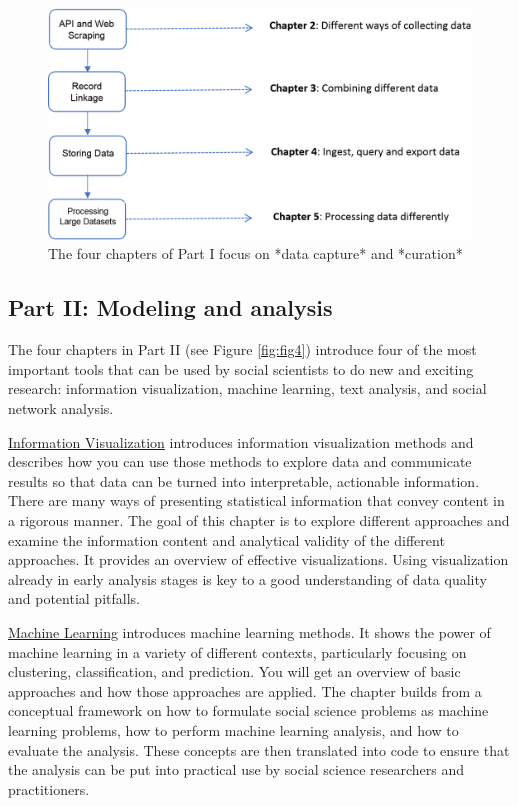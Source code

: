 \documentclass[]{krantz}
\begin{document}
\begin{figure}

{\centering \includegraphics[width=0.9\linewidth]{ChapterIntro/figures/Figure2_new} 

}

\caption{The four chapters of Part I focus on *data capture* and *curation*}\label{fig:fig3}
\end{figure}

\subsection{Part II: Modeling and
analysis}\label{part-ii-modeling-and-analysis}

The four chapters in Part II (see Figure \ref{fig:fig4}) introduce four
of the most important tools that can be used by social scientists to do
new and exciting research: information visualization, machine learning,
text analysis, and social network analysis.

\protect\hyperlink{chap:viz}{Information Visualization} introduces
information visualization methods and describes how you can use those
methods to explore data and communicate results so that data can be
turned into interpretable, actionable information. There are many ways
of presenting statistical information that convey content in a rigorous
manner. The goal of this chapter is to explore different approaches and
examine the information content and analytical validity of the different
approaches. It provides an overview of effective visualizations. Using
visualization already in early analysis stages is key to a good
understanding of data quality and potential pitfalls.

\protect\hyperlink{chap:ml}{Machine Learning} introduces machine
learning methods. It shows the power of machine learning in a variety of
different contexts, particularly focusing on clustering, classification,
and prediction. You will get an overview of basic approaches and how
those approaches are applied. The chapter builds from a conceptual
framework on how to formulate social science problems as machine
learning problems, how to perform machine learning analysis, and how to
evaluate the analysis. These concepts are then translated into code to
ensure that the analysis can be put into practical use by social science
researchers and practitioners.
\end{document}
